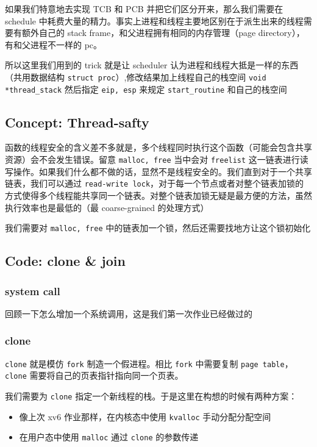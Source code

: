 如果我们特意地去实现 TCB 和 PCB 并把它们区分开来，那么我们需要在 schedule 中耗费大量的精力。事实上进程和线程主要地区别在于派生出来的线程需要有额外自己的 stack frame，和父进程拥有相同的内存管理（page directory），有和父进程不一样的 pc。

所以这里我们用到的 trick 就是让 scheduler 认为进程和线程大抵是一样的东西（共用数据结构 \texttt{struct proc}）,修改结果加上线程自己的栈空间 \texttt{void *thread\_stack} 然后指定 \texttt{eip, esp} 来规定 \texttt{start\_routine} 和自己的栈空间

\subsection{Concept: Thread-safty}

函数的线程安全的含义差不多就是，多个线程同时执行这个函数（可能会包含共享资源）会不会发生错误。留意 \texttt{malloc, free} 当中会对 \texttt{freelist} 这一链表进行读写操作。如果我们什么都不做的话，显然不是线程安全的。我们直到对于一个共享链表，我们可以通过 \texttt{read-write lock}，对于每一个节点或者对整个链表加锁的方式使得多个线程能共享同一个链表。对整个链表加锁无疑是最方便的方法，虽然执行效率也是最低的（最 coarse-grained 的处理方式）

我们需要对 \texttt{malloc, free} 中的链表加一个锁，然后还需要找地方让这个锁初始化


\subsection{Code: clone \& join}

\subsubsection{system call}

回顾一下怎么增加一个系统调用，这是我们第一次作业已经做过的


\subsubsection{clone}

\texttt{clone} 就是模仿 \texttt{fork} 制造一个假进程。相比 \texttt{fork} 中需要复制 \texttt{page table}，\texttt{clone} 需要将自己的页表指针指向同一个页表。

我们需要为 \texttt{clone} 指定一个新线程的栈。于是这里在构想的时候有两种方案：

\begin{itemize}
	\item 像上次 xv6 作业那样，在内核态中使用 \texttt{kvalloc} 手动分配分配空间
	\item 在用户态中使用 \texttt{malloc} 通过 \texttt{clone} 的参数传递
\end{itemize}

